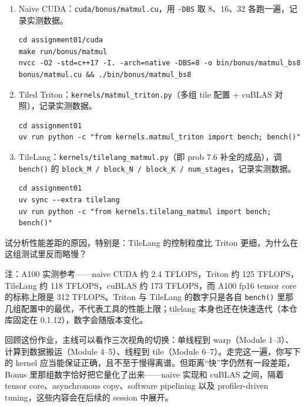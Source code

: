 \documentclass[11pt,a4paper,fontset=none]{ctexart}
\begin{document}
\begin{enumerate}[label=(\alph*)]
  \item Naive CUDA：\texttt{cuda/bonus/matmul.cu}，用 \texttt{-DBS} 取 8、16、32 各跑一遍，记录实测数据。
\begin{lstlisting}
cd assignment01/cuda
make run/bonus/matmul
nvcc -O2 -std=c++17 -I. -arch=native -DBS=8 -o bin/bonus/matmul_bs8 bonus/matmul.cu && ./bin/bonus/matmul_bs8
\end{lstlisting}
  \item Tiled Triton：\texttt{kernels/matmul\_triton.py}（多组 tile 配置 + cuBLAS 对照），记录实测数据。
\begin{lstlisting}
cd assignment01
uv run python -c "from kernels.matmul_triton import bench; bench()"
\end{lstlisting}
  \item TileLang：\texttt{kernels/tilelang\_matmul.py}（即 prob 7.6 补全的成品），调 \texttt{bench()} 的 \texttt{block\_M / block\_N / block\_K / num\_stages}，记录实测数据。
\begin{lstlisting}
cd assignment01
uv sync --extra tilelang
uv run python -c "from kernels.tilelang_matmul import bench; bench()"
\end{lstlisting}
\end{enumerate}

试分析性能差距的原因，特别是：TileLang 的控制粒度比 Triton 更细，为什么在这组测试里反而略慢？

注：A100 实测参考——naive CUDA 约 2.4 TFLOPS，Triton 约 125 TFLOPS，TileLang 约 118 TFLOPS，cuBLAS 约 173 TFLOPS，而 A100 fp16 tensor core 的标称上限是 312 TFLOPS。Triton 与 TileLang 的数字只是各自 \texttt{bench()} 里那几组配置中的最优，不代表工具的性能上限；tilelang 本身也还在快速迭代（本仓库固定在 0.1.12），数字会随版本变化。
\begin{lookback}
回顾这份作业，主线可以看作三次视角的切换：单线程到 warp（Module 1--3）、计算到数据搬运（Module 4--5）、线程到 tile（Module 6--7）。走完这一遍，你写下的 kernel 应当能保证正确，且不至于慢得离谱。但距离“快”字仍然有一段差距，Bonus 里那组数字恰好把它量化了出来——naive 实现和 cuBLAS 之间，隔着 tensor core、asynchronous copy、software pipelining 以及 profiler-driven tuning，这些内容会在后续的 session 中展开。
\end{lookback}
\end{document}
